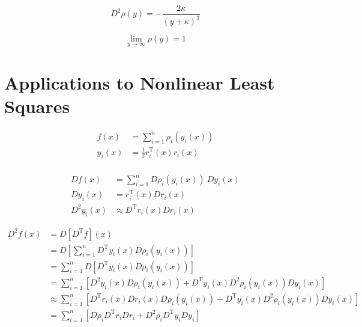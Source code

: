\documentclass{article}
\newcommand{\T}{\mathrm{T}}
\begin{document}
\begin{equation}
	D^2 \rho (y) = -\frac{2 \kappa}{(y + \kappa)^3}
\end{equation}

\begin{equation}
	\lim_{y \rightarrow \infty} \rho(y) = 1
\end{equation}

\section{Applications to Nonlinear Least Squares}

\begin{align}
	f(x)   & = \sum_{i=1}^n \rho_i(y_i(x))  \\
	y_i(x) & = \frac{1}{2} r_i^\T(x) r_i(x) \\
\end{align}

\begin{align}
	Df(x)      & = \sum_{i=1}^n D \rho_i(y_i(x)) \ Dy_i(x) \\
	Dy_i(x)    & = r_i^\T (x) Dr_i(x)                      \\
	D^2 y_i(x) & \approx D^\T r_i(x) Dr_i(x)
\end{align}

\begin{align}
	D^2 f(x) & =  D \left[ D^\T f \right](x)                                                                                     \\
	         & = D \left[ \sum_{i=1}^n D^\T y_i(x) D \rho_i(y_i(x)) \right]                                                      \\
	         & = \sum_{i=1}^n D \left[ D^\T y_i(x) D \rho_i(y_i(x)) \right]                                                      \\
	         & = \sum_{i=1}^n \left[ D^2 y_i(x) D \rho_i(y_i(x)) + D^\T y_i(x) D^2 \rho_i(y_i(x)) Dy_i(x) \right]                \\
	         & \approx \sum_{i=1}^n \left[ D^\T r_i(x) Dr_i(x) D \rho_i(y_i(x)) + D^\T y_i(x) D^2 \rho_i(y_i(x)) Dy_i(x) \right] \\
	         & = \sum_{i=1}^n \left[ D\rho_i D^\T r_i Dr_i + D^2 \rho_i D^\T y_i Dy_i \right]
\end{align}
\end{document}
